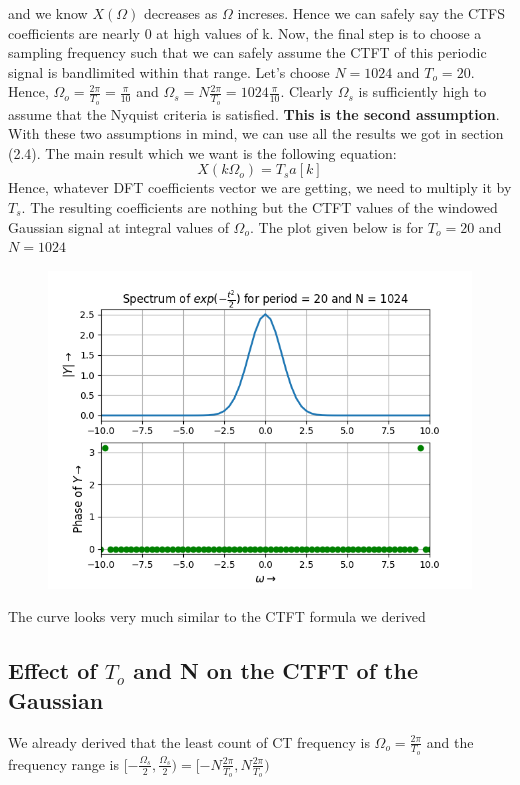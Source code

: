 \documentclass[12pt, a4paper]{article}
\begin{document}
and we know $X(\Omega)$ decreases as $\Omega$ increses. Hence we can safely say the CTFS coefficients are nearly 0 at high values of k. Now, the final step is to choose a sampling frequency such that we can safely assume the CTFT of this periodic signal is bandlimited within that range. Let's choose $N=1024$ and $T_{o} = 20$. Hence, $\Omega_{o} = \frac{2\pi}{T_{o}} = \frac{\pi}{10}$ and $\Omega_{s} = N\frac{2\pi}{T_{o}} = 1024\frac{\pi}{10}$. Clearly $\Omega_{s}$ is sufficiently high to assume that the Nyquist criteria is satisfied. \textbf{This is the second assumption}. With these two assumptions in mind, we can use all the results we got in section (2.4). The main result which we want is the following equation:
\begin{equation*}
    X(k\Omega_{o}) = T_{s}a[k]
\end{equation*}
Hence, whatever DFT coefficients vector we are getting, we need to multiply it by $T_{s}$. The resulting coefficients are nothing but the CTFT values of the windowed Gaussian signal at integral values of $\Omega_{o}$. The plot given below is for $T_{o} = 20$ and $N=1024$
\vspace*{-0.5cm}
\begin{figure}[H]
    \centering
    \includegraphics[scale = 0.8]{Figure_10.png}
    \label{fig:sample}
\end{figure}
\begin{center}
    The curve looks very much similar to the CTFT formula we derived
\end{center}
\subsection{Effect of $T_{o}$ and N on the CTFT of the Gaussian}
We already derived that the least count of CT frequency is $\Omega_{o} = \frac{2\pi}{T_{o}}$ and the frequency range is $[-\frac{\Omega_{s}}{2},\frac{\Omega_{s}}{2}) = [-N\frac{2\pi}{T_{o}},N\frac{2\pi}{T_{o}})$ 
\end{document}
